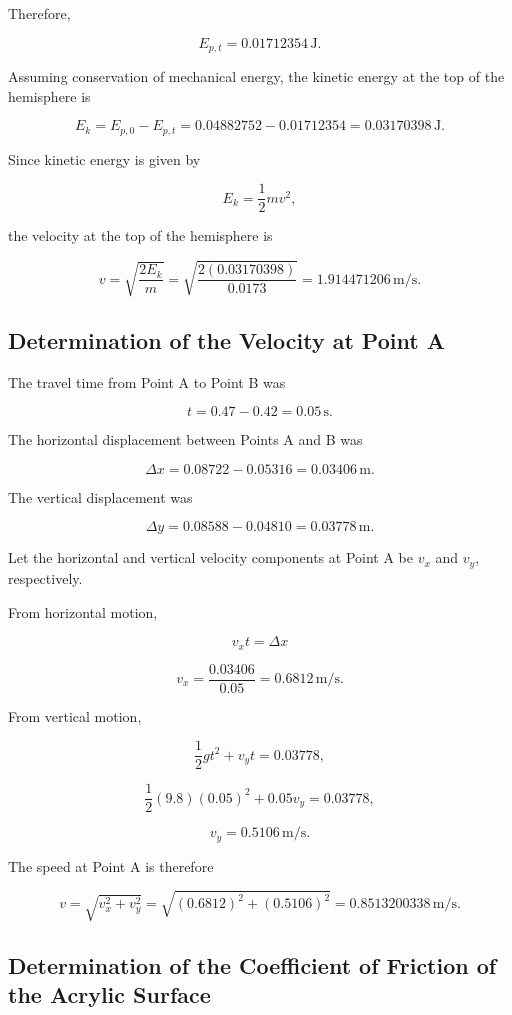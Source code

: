 \documentclass[11pt,letterpaper]{article}
\begin{document}
Therefore,

\[
E_{p,t}=0.01712354\,\mathrm{J}.
\]

Assuming conservation of mechanical energy, the kinetic energy at the top of the hemisphere is

\[
E_k
=E_{p,0}-E_{p,t}
=0.04882752-0.01712354
=0.03170398\,\mathrm{J}.
\]

Since kinetic energy is given by

\[
E_k=\frac{1}{2}mv^2,
\]

the velocity at the top of the hemisphere is

\[
v
=
\sqrt{\frac{2E_k}{m}}
=
\sqrt{\frac{2(0.03170398)}{0.0173}}
=
1.914471206\,\mathrm{m/s}.
\]

\subsection{Determination of the Velocity at Point A}

The travel time from Point A to Point B was

\[
t=0.47-0.42=0.05\,\mathrm{s}.
\]

The horizontal displacement between Points A and B was

\[
\Delta x
=
0.08722-0.05316
=
0.03406\,\mathrm{m}.
\]

The vertical displacement was

\[
\Delta y
=
0.08588-0.04810
=
0.03778\,\mathrm{m}.
\]

Let the horizontal and vertical velocity components at Point A be $v_x$ and $v_y$, respectively.

From horizontal motion,

\[
v_xt=\Delta x
\]

\[
v_x
=
\frac{0.03406}{0.05}
=
0.6812\,\mathrm{m/s}.
\]

From vertical motion,

\[
\frac{1}{2}gt^2+v_yt
=
0.03778,
\]

\[
\frac{1}{2}(9.8)(0.05)^2
+
0.05v_y
=
0.03778,
\]

\[
v_y
=
0.5106\,\mathrm{m/s}.
\]

The speed at Point A is therefore

\[
v
=
\sqrt{v_x^2+v_y^2}
=
\sqrt{(0.6812)^2+(0.5106)^2}
=
0.8513200338\,\mathrm{m/s}.
\]

\subsection{Determination of the Coefficient of Friction of the Acrylic Surface}
\end{document}

